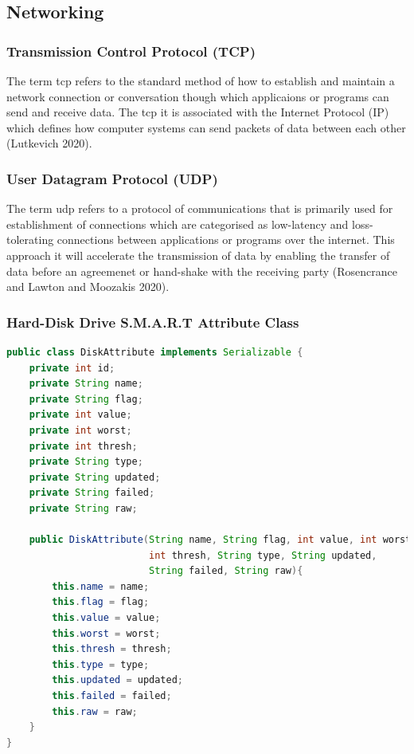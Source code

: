 \subsection{Networking}

\subsubsection{Transmission Control Protocol (TCP)}

The term \acrfull{tcp} refers to the standard method of how to establish and maintain
a network connection or conversation though which applicaions or programs can send
and receive data. The \acrfull{tcp} it is associated with the Internet Protocol (IP)
which defines how computer systems can send packets of data between each other (Lutkevich 2020).

\subsubsection{User Datagram Protocol (UDP)}

The term \acrfull{udp} refers to a protocol of communications that is primarily used for
establishment of connections which are categorised as low-latency and loss-tolerating
connections between applications or programs over the internet. This approach it will
accelerate the transmission of data by enabling the transfer of data before an
agreemenet or hand-shake with the receiving party (Rosencrance and Lawton and Moozakis 2020).

\subsubsection{Hard-Disk Drive S.M.A.R.T Attribute Class}

\begin{lstlisting}[language=Java, style=Oracle, columns=fullflexible,
caption=Hard-Disk Drive S.M.A.R.T Attribute Class,
captionpos=b]
public class DiskAttribute implements Serializable {
    private int id;
    private String name;
    private String flag;
    private int value;
    private int worst;
    private int thresh;
    private String type;
    private String updated;
    private String failed;
    private String raw;

    public DiskAttribute(String name, String flag, int value, int worst,
                         int thresh, String type, String updated,
                         String failed, String raw){
        this.name = name;
        this.flag = flag;
        this.value = value;
        this.worst = worst;
        this.thresh = thresh;
        this.type = type;
        this.updated = updated;
        this.failed = failed;
        this.raw = raw;
    }
}
\end{lstlisting}

